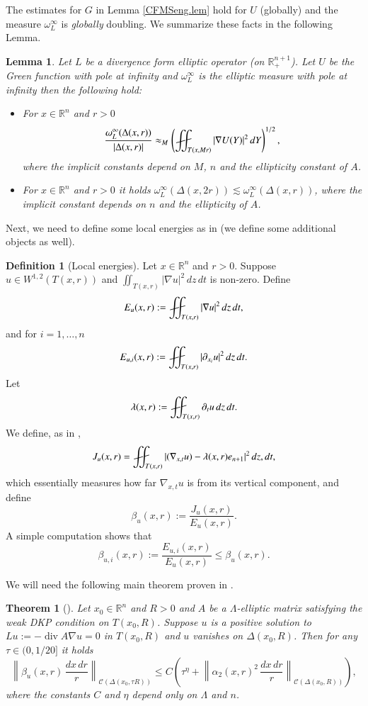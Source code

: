 \documentclass[11pt, a4paper,leqno]{amsart}
\def\Yint#1{\mathchoice
    {\YYint\displaystyle\textstyle{#1}}%
    {\YYint\textstyle\scriptstyle{#1}}%
    {\YYint\scriptstyle\scriptscriptstyle{#1}}%
    {\YYint\scriptscriptstyle\scriptscriptstyle{#1}}%
      \!\iint}
\def\YYint#1#2#3{{\setbox0=\hbox{$#1{#2#3}{\iint}$}
    \vcenter{\hbox{$#2#3$}}\kern-.51\wd0}}
\def\longdash{{-}\mkern-3.5mu{-}}
\def\tiltlongdash{\rotatebox[origin=c]{15}{$\longdash$}}
\def\fiint{\Yint\tiltlongdash}
\theoremstyle{plain}
\newtheorem{theorem}[equation]{Theorem}
\newtheorem{lemma}[equation]{Lemma}
\theoremstyle{definition}
\newtheorem{definition}[equation]{Definition}
\theoremstyle{remark}
\numberwithin{equation}{section}
\newcommand{\rn}{\mathbb{R}^n}
\newcommand{\ree}{\mathbb{R}^{n+1}}
\newcommand{\hm}{\omega}
\def\Yint#1{\mathchoice
    {\YYint\displaystyle\textstyle{#1}}%
    {\YYint\textstyle\scriptstyle{#1}}%
    {\YYint\scriptstyle\scriptscriptstyle{#1}}%
    {\YYint\scriptscriptstyle\scriptscriptstyle{#1}}%
      \!\iint}
\def\YYint#1#2#3{{\setbox0=\hbox{$#1{#2#3}{\iint}$}
    \vcenter{\hbox{$#2#3$}}\kern-.51\wd0}}
\def\longdash{{-}\mkern-3.5mu{--}}
\def\tiltlongdash{\rotatebox[origin=c]{15}{$\longdash$}}
\def\fiint{\Yint\tiltlongdash}
\def\div{\mathop{\operatorname{div}}\nolimits}
\begin{document}
The estimates for $G$ in Lemma \ref{CFMSeng.lem} hold for $U$ (globally) and the measure $\hm^\infty_L$ is {\it globally} doubling. We summarize these facts in the following Lemma. 
\begin{lemma}\label{gfinftyfacts.lemma}
Let $L$ be a divergence form elliptic operator (on $\ree_+$). Let $U$ be the Green function with pole at infinity and $\hm^\infty_L$ is the elliptic measure with pole at infinity then the following hold:
\begin{itemize}
\item For $x \in \rn$ and $r > 0$
\[\frac{\hm^\infty_L (\Delta(x,r))}{|\Delta(x,r)|} \approx_M  \left(\fiint_{T(x,Mr)} |\nabla U(Y)|^2\, dY \right)^{1/2},\]
where the implicit constants depend on $M$, $n$ and the ellipticity constant of $A$.
\item For $x \in \rn$ and $r > 0$ it holds $\hm^\infty_L(\Delta(x,2r))\lesssim \hm^\infty_L(\Delta(x,r))$, where the implicit constant depends on $n$ and the ellipticity of $A$.
\end{itemize}
\end{lemma}



Next, we need to define some local energies as in \cite{DLM} (we define some additional objects as well).

\begin{definition}[Local energies]\label{localenergies.def}
Let $x \in \mathbb{R}^n$ and $r > 0$. Suppose $u \in W^{1,2}(T(x,r))$ and $\iint_{T(x,r)} |\nabla u|^2 \, dz \, dt$ is non-zero. Define
\[E_u(x,r) := \fiint_{T(x,r)} |\nabla u|^2 \, dz \, dt,\] 
and for $i = 1, \dots, n$
\[E_{u,i} (x,r) := \fiint_{T(x,r)} |\partial_{x_i} u|^2 \, dz \, dt.\]
Let
\[\lambda(x,r) := \fiint_{T(x,r)} \partial_{t} u \, dz \, dt. \]
We define, as in \cite{DLM},
\[J_u(x,r) = \fiint_{T(x,r)} |(\nabla_{x,t} u) - \lambda(x,r) e_{n+1}|^2 \, dz, dt,\]
which essentially measures how far $\nabla_{x,t}u $ is from its vertical component,
and define
\[\beta_u(x,r):= \frac{J_u(x,r)}{E_u(x,r)}.\]
A simple computation shows that 
\begin{equation}\label{betais.eq}
\beta_{u,i}(x,r):= \frac{E_{u,i}(x,r)}{E_u(x,r)} \le \beta_u(x,r).
\end{equation}
\end{definition}

We will need the following main theorem proven in \cite{DLM}.

\begin{theorem}[{\cite[Theorem 1.15]{DLM}}]\label{DLMeng.thrm}
Let $x_0 \in \mathbb{R}^n$ and $R > 0$ and $A$ be a $\Lambda$-elliptic matrix satisfying the weak DKP condition on $T(x_0,R)$. Suppose $u$ is a positive solution to $L u := -\div A \nabla u = 0$ in $T(x_0, R)$ and $u$ vanishes on $\Delta(x_0,R)$. Then for any $\tau \in (0,1/20]$ it holds
\[\left\|\beta_u(x,r) \, \frac{dx\, dr}{r}\right\|_{\mathcal{C}(\Delta(x_0,\tau R))} \le C\left(\tau^\eta  + \left\|\alpha_2(x,r)^2 \, \frac{dx\, dr}{r}\right\|_{\mathcal{C}(\Delta(x_0, R))}\right),\]
where the constants $C$ and $\eta$ depend only on $\Lambda$ and $n$.
\end{theorem}
\end{document}
